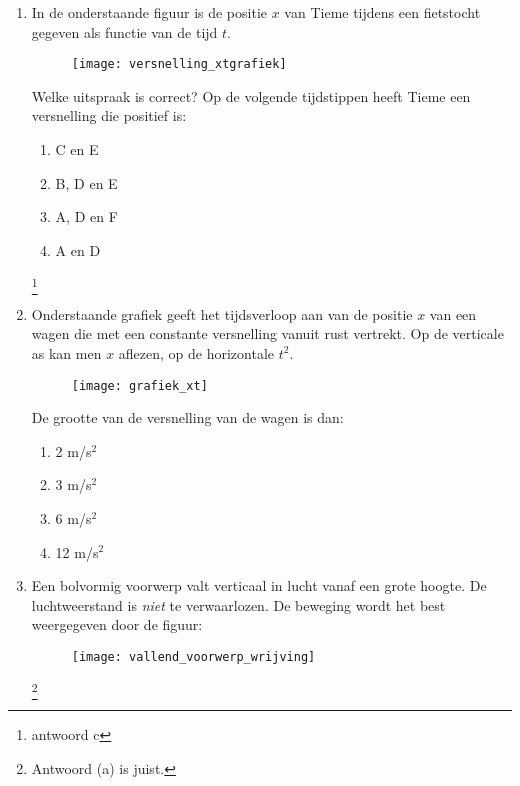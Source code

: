 \begin{enumerate}
\item In de onderstaande figuur is de positie $x$ van Tieme tijdens een fietstocht
gegeven als functie van de tijd $t$.
\begin{figure}[h]
\begin{center}
\texttt{[image: versnelling\_xtgrafiek]}
\end{center}
\end{figure}
\newline
Welke uitspraak is correct? Op de volgende tijdstippen heeft Tieme
een versnelling die positief is:
\begin{enumerate}
\item C en E
\item B, D en E
\item A, D en F
\item A en D
\end{enumerate}
\footnote{antwoord c}

\item Onderstaande grafiek geeft het
tijdsverloop aan van de positie $x$ van een wagen die met een
constante versnelling vanuit rust vertrekt. Op de verticale as kan
men $x$ aflezen, op de horizontale $t^2$.
\begin{figure}[h]
\begin{center}
\texttt{[image: grafiek\_xt]}
\end{center}
\end{figure}
\newline
De grootte van de versnelling van de wagen is dan:
\begin{enumerate}
\item 2 m/s$^2$
\item 3 m/s$^2$
\item 6 m/s$^2$
\item 12 m/s$^2$
\end{enumerate}



\item Een bolvormig voorwerp valt verticaal in lucht vanaf een grote
hoogte. De luchtweerstand is \textit{niet} te verwaarlozen. De
beweging wordt het best weergegeven door de figuur:
\begin{figure}[h]
\begin{center}
\texttt{[image: vallend\_voorwerp\_wrijving]}
\end{center}
\end{figure}
\footnote{Antwoord (a) is juist.}


\end{enumerate}
